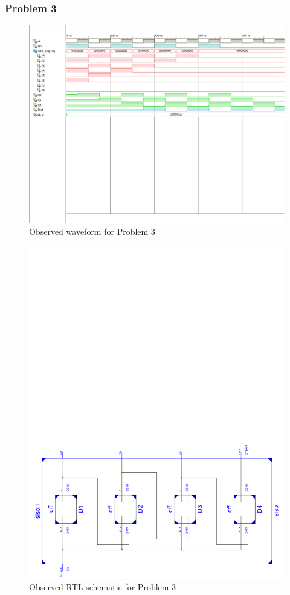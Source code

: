 \documentclass{lab_sheet}
\begin{document}
    \subsubsection*{Problem 3}
    \begin{figure}[H]
        \centering
        \includegraphics[width=.95\linewidth, frame]{../Figures/3.pdf}
        \caption{Observed waveform for Problem 3}
        \label{fig:obs3}
    \end{figure}
    \begin{figure}[H]
        \centering
        \includegraphics[scale=0.5]{../Figures/q3_ckt.pdf}
        \caption{Observed RTL schematic for Problem 3}
        \label{fig:rtl3}
    \end{figure}
\end{document}
